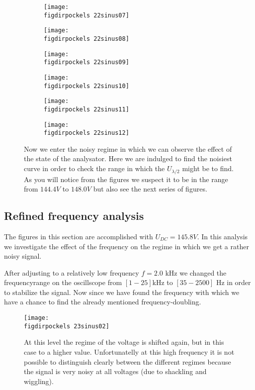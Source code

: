 \flushleft
\begin{figure}
    \begin{subfigure}[b]{\picwidth}
        \texttt{[image: \\figdirpockels 22sinus07]}
        \caption{}
    \end{subfigure}\qquad
    \begin{subfigure}[b]{\picwidth}
        \texttt{[image: \\figdirpockels 22sinus08]}
        \caption{}
    \end{subfigure}
    \begin{subfigure}[b]{\picwidth}
        \texttt{[image: \\figdirpockels 22sinus09]}
        \caption{}
    \end{subfigure}
    \begin{subfigure}[b]{\picwidth}
        \texttt{[image: \\figdirpockels 22sinus10]}
        \caption{}
    \end{subfigure}
    \begin{subfigure}[b]{\picwidth}
        \texttt{[image: \\figdirpockels 22sinus11]}
        \caption{}
    \end{subfigure}
    \begin{subfigure}[b]{\picwidth}
        \texttt{[image: \\figdirpockels 22sinus12]}
        \caption{}
    \end{subfigure}

    \caption{Now we enter the noisy regime in which we can 
        observe the effect of the state of the analysator. 
        Here we are indulged to find the noisiest curve in 
        order to check the range in which the $U_{\lambda / 2}$
        might be to find. As you will notice from the figures we
        suspect it to be in the range from $144.4V$ to $148.0V$
        but also see the next series of figures.}
    \label{fig:sinus2}
\end{figure}
\subsection{Refined frequency analysis}
The figures in this section are accomplished with $U_{DC}=145.8 V$.
In this analysis we investigate the effect of the frequency
on the regime in which we get a rather noisy signal. 

After
adjusting to a relatively low frequency $f=2.0$ kHz we changed
the frequencyrange on the oscillscope from 
$[1 - 25]$kHz to $[35 - 2500]$ Hz in order to stabilize the signal.
Now since we have found the frequency with which we have a chance
to find the already mentioned frequency-doubling.
\begin{figure}
    \texttt{[image: \\figdirpockels 23sinus02]}
    \caption{At this level the regime of the voltage is shifted
        again, but in this case to a higher value. Unfortunatelly
        at this high frequency it is not possible to distinguish
        clearly between the different regimes because the signal
        is very noisy at all voltages (due to shackling 
            and wiggling).}
\end{figure}
\clearpage
